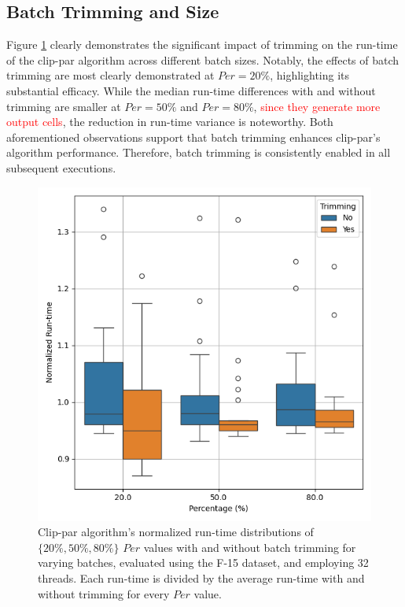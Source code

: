 \documentclass{egpubl}
\newcommand*{\fix}[1]{\textcolor{red}{#1}}
\begin{document}
\subsection{Batch Trimming and Size}
\label{sec:batch-size-and-trimming}
Figure \ref{fig:batch-trimming} clearly demonstrates the significant impact of trimming on the run-time of the clip-par algorithm across different batch sizes. Notably, the effects of batch trimming are most clearly demonstrated at $Per = 20\%$, highlighting its substantial efficacy. While the median run-time differences with and without trimming are smaller at $Per = 50\%$ and $Per = 80\%$, \fix{since they generate more output cells}, the reduction in run-time variance is noteworthy. Both aforementioned observations support that batch trimming enhances clip-par's algorithm performance. Therefore, batch trimming is consistently enabled in all subsequent executions.


\begin{figure}[H]
    \centering
    \includegraphics[width=\linewidth]{./Figures/Batch-Trimming.png}
    \caption{Clip-par algorithm's normalized run-time distributions of  $\{20\%, 50\%, 80\%\}$ $Per$ values with and without batch trimming for varying batches, evaluated using the F-15 dataset, and employing 32 threads. Each run-time is divided by the average run-time with and without trimming for every $Per$ value.}
    \label{fig:batch-trimming}
\end{figure}
\end{document}
